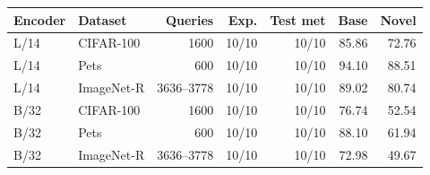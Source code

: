 \begin{tabular}{llrrrrr}
\toprule
Encoder & Dataset & Queries & Exp. & Test met & Base & Novel \\
\midrule
L/14 & CIFAR-100 & 1600 & 10/10 & 10/10 & 85.86 & 72.76 \\
L/14 & Pets & 600 & 10/10 & 10/10 & 94.10 & 88.51 \\
L/14 & ImageNet-R & 3636--3778 & 10/10 & 10/10 & 89.02 & 80.74 \\
\midrule
B/32 & CIFAR-100 & 1600 & 10/10 & 10/10 & 76.74 & 52.54 \\
B/32 & Pets & 600 & 10/10 & 10/10 & 88.10 & 61.94 \\
B/32 & ImageNet-R & 3636--3778 & 10/10 & 10/10 & 72.98 & 49.67 \\
\bottomrule
\end{tabular}
